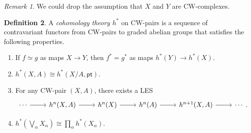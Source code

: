 \documentclass[10pt,letterpaper,cm]{nupset}
\theoremstyle{definition}
\newtheorem{definition}{Definition}[subsection]
\theoremstyle{theorem}
\theoremstyle{remark}
\newtheorem{remark}[definition]{Remark}
\newcommand{\1}{\mathbb{1}}
\newcommand{\0}{\vec 0}
\newcommand{\pt}{\mathsf{pt}}
\begin{document}
\begin{remark}
We could drop the assumption that $X$ and $Y$ are CW-complexes.
\end{remark}

\begin{definition}
A \textit{cohomology theory $h^{\ast}$} on CW-pairs is a sequence of contravariant functors from CW-pairs to graded abelian groups that satisfies the following properties.
\begin{enumerate}[label=(\arabic*)]
\item If $f \simeq g$ as maps $X\to Y$, then $f^{\ast} = g^{\ast}$ as maps $h^{\ast}(Y) \to h^{\ast}(X)$.
\item $h^{\ast}(X, A) \cong h^{\ast}(X/A, \pt)$.
\item For any CW-pair $\left(X, A\right)$, there exists a LES
\[
\begin{tikzcd}
\cdots \arrow[r] & h^n(X, A) \arrow[r] & h^n(X) \arrow[r] & h^n(A) \arrow[r] & h^{n+1}(X, A) \arrow[r] & \cdots
\end{tikzcd}.
\]
\item $h^{\ast}\left(\bigvee_{\alpha} X_{\alpha}\right) \cong \prod_{\alpha} h^{\ast}(X_{\alpha})$.
\end{enumerate}
\end{definition}
\end{document}
